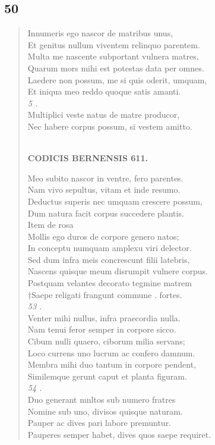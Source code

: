 \documentclass[11pt, a4paper]{report}
\begin{document}
            \subsection*{50}
      \begin{verse}
      Innumeris ego nascor de matribus unus, \\ Et genitus nullum viventem relinquo parentem. \\ Multa me nascente subportant vulnera matres, \\ Quarum mors mihi est potestas data per omnes. \\ Laedere non possum, me si quis oderit, umquam, \\ Et iniqua meo reddo quoque satis amanti. \\ \textit{5 .} \\ Multiplici veste natus de matre producor, \\ Nec habere corpus possum, si vestem amitto. \\ 
        ﻿\pagebreak 
    \begin{center} \textbf{CODICIS BERNENSIS 611.} \end{center} \marginpar{[367]} Meo subito nascor in ventre, fero parentes. \\ Nam vivo sepultus, vitam et inde resumo. \\ Deductus superis nec umquam crescere possum, \\ Dum natura facit corpus succedere plantis. \\ Item de rosa \\ Mollis ego duros de corpore genero natos; \\ In conceptu numquam amplexu viri delector. \\ Sed dum infra meis concrescunt filii latebris, \\ Nascens quisque meum disrumpit vulnere corpus. \\ Postquam velantes decorato tegmine matrem \\ †Saepe religati frangunt commune . fortes. \\ \textit{53 .} \\ Venter mihi nullus, infra praecordia nulla. \\ Nam tenui feror semper in corpore sicco. \\ Cibum nulli quaero, ciborum milia servans; \\ Loco currens uno lucrum ac confero damnum. \\ Membra mihi duo tantum in corpore pendent, \\ Similemque gerunt caput et planta figuram. \\ \textit{54 .} \\ Duo generant mnltos sub numero fratres \\ Nomine sub uno, divisos quisque naturam. \\ Pauper ac dives pari labore premuntur. \\ Pauperes semper habet, dives quos saepe requiret. \\ 

\end{verse}
\end{document}
